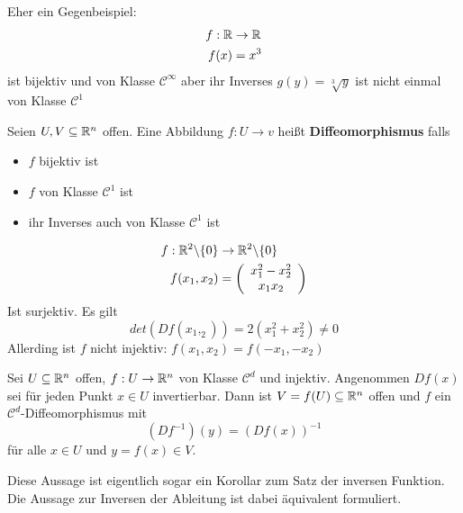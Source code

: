\documentclass[main.tex]{subfiles}
\begin{document}
\begin{Beispiel}
  Eher ein Gegenbeispiel:
  $$\begin{aligned}
    f: \mathbb{R} & \to \mathbb{R} \\
    f(x) & = x^3
  \end{aligned}$$
  ist bijektiv und von Klasse $\mathcal{C}^\infty$ aber ihr Inverses $g(y) = \sqrt[3]{y}$ ist nicht einmal von Klasse $\mathcal{C}^1$
\end{Beispiel}

\begin{Definition}[Diffeomorphismen]
  Seien $U,V \subseteq \mathbb{R}^n$ offen. Eine Abbildung $f: U \to v$ heißt \textbf{Diffeomorphismus} falls
  \begin{itemize}
    \item $f$ bijektiv ist
    \item $f$ von Klasse $\mathcal{C}^1$ ist
    \item ihr Inverses auch von Klasse $\mathcal{C}^1$ ist
  \end{itemize}
\end{Definition}

\begin{Beispiel}
  $$\begin{aligned}
    f : \mathbb{R}^2 \backslash\{0\} & \to \mathbb{R}^2 \backslash\{0\} \\
    f(x_1,x_2) & = \left(\begin{array}{c}
      x_1^2 - x_2^2 \\ x_1 x_2
    \end{array}\right)
  \end{aligned}$$
  Ist surjektiv. Es gilt
  $$det(Df(x_1,_2)) = 2(x_1^2 + x_2^2) \neq 0$$
  Allerding ist $f$ nicht injektiv: $f(x_1,x_2) = f(-x_1,-x_2)$
\end{Beispiel}

\begin{Theorem}
  Sei $U \subseteq \mathbb{R}^n$ offen, $f: U \to \mathbb{R}^n$ von Klasse $\mathcal{C}^d$ und injektiv. Angenommen $Df(x)$ sei für jeden Punkt $x \in U$ invertierbar. Dann ist $V= f(U) \subseteq \mathbb{R}^n$ offen und $f$ ein $\mathcal{C}^d$-Diffeomorphismus mit
  $$(Df^{-1})(y) = (Df(x))^{-1}$$
  für alle $x \in U$ und $y = f(x) \in V$.
\end{Theorem}

\begin{Bemerkung}
  Diese Aussage ist eigentlich sogar ein Korollar zum Satz der inversen Funktion. Die Aussage zur Inversen der Ableitung ist dabei äquivalent formuliert.
\end{Bemerkung}
\end{document}
